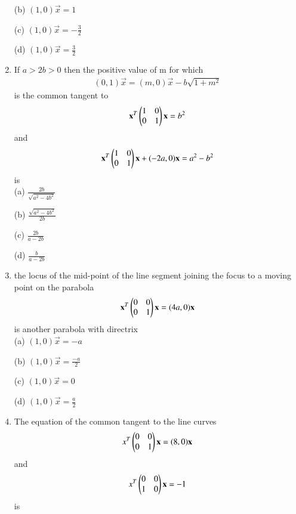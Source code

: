 \documentclass[journal,12pt,twocolumn]{IEEEtran}
\begin{document}
\begin{enumerate}
    \choice (b) $(1,0)\vec x=1$
    
    \choice (c) $(1,0)\vec x=-\frac{3}{2}$
    
    \choice (d) $(1,0)\vec x=\frac{3}{2}$\\
    
    \item If $a>2b>0$ then the positive value of m for which \begin{align}(0,1)\vec x=(m,0)\vec x-b\sqrt{1+m^2}\end{align} is the common tangent to \begin{align}\mathbf x^T\begin{pmatrix}1 & 0 \\0 & 1\end{pmatrix}\mathbf x=b^2\end {align}and \begin{align}\mathbf x^T\begin{pmatrix}1 & 0 \\0 &1\end{pmatrix}\mathbf x+(-2a,0)\mathbf x=a^2-b^2\end{align} is \\
    
    \choice (a) $\frac{2b}{\sqrt{a^2-4b^2}}$
    
    \choice (b) $\frac{\sqrt{a^2-4b^2}}{2b}$
    
    \choice (c) $\frac{2b}{a-2b}$
    
    \choice (d) $\frac{b}{a-2b}$\\
    
    \item the locus of the mid-point of the line segment joining the focus to a moving point on the parabola  \begin{align} \mathbf x^T\begin{pmatrix}0 & 0 \\0 & 1\end{pmatrix}\mathbf x=(4a,0)\mathbf x\end{align} is another parabola with directrix \\
    
    \choice (a) $(1,0)\vec x=-a$
    
    \choice (b) $(1,0)\vec x=\frac{-a}{2}$
    
    \choice (c) $(1,0)\vec x=0$
    
    \choice (d) $(1,0)\vec x=\frac{a}{2}$\\
    
    \item The equation of the common tangent to the line curves \begin{align} x^T \begin{pmatrix}0 & 0 \\0 & 1\end{pmatrix}\mathbf x=(8,0)\mathbf x\end {align} and \begin{align} x^T \begin{pmatrix}0 & 0 \\1& 0\end{pmatrix}\mathbf x=-1\end{align}is\\
    

\end{enumerate}
\end{document}
